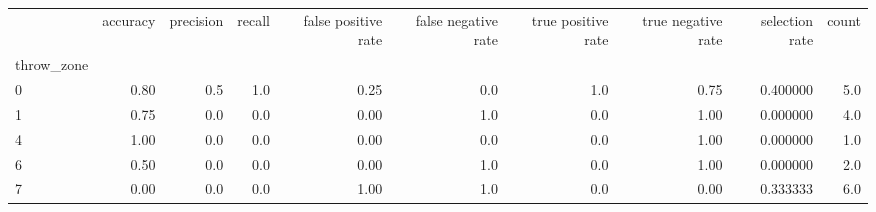 \begin{tabular}{lrrrrrrrrr}
\toprule
{} &  accuracy &  precision &  recall &  false positive rate &  false negative rate &  true positive rate &  true negative rate &  selection rate &  count \\
throw\_zone &           &            &         &                      &                      &                     &                     &                 &        \\
\midrule
0          &      0.80 &        0.5 &     1.0 &                 0.25 &                  0.0 &                 1.0 &                0.75 &        0.400000 &    5.0 \\
1          &      0.75 &        0.0 &     0.0 &                 0.00 &                  1.0 &                 0.0 &                1.00 &        0.000000 &    4.0 \\
4          &      1.00 &        0.0 &     0.0 &                 0.00 &                  0.0 &                 0.0 &                1.00 &        0.000000 &    1.0 \\
6          &      0.50 &        0.0 &     0.0 &                 0.00 &                  1.0 &                 0.0 &                1.00 &        0.000000 &    2.0 \\
7          &      0.00 &        0.0 &     0.0 &                 1.00 &                  1.0 &                 0.0 &                0.00 &        0.333333 &    6.0 \\
\bottomrule
\end{tabular}
